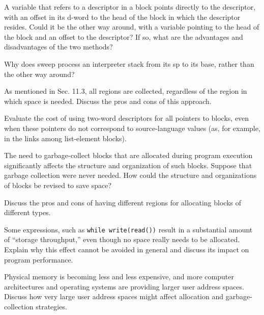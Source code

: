  A variable that refers to a descriptor in a
block points directly to the descriptor, with an offset in its d-word
to the head of the block in which the descriptor resides. Could it be
the other way around, with a variable pointing to the head of the
block and an offset to the descriptor? If so, what are the advantages
and disadvantages of the two methods?

 Why does sweep process an interpreter stack from
its sp to its base, rather than the other way around?

 As mentioned in Sec. 11.3, all regions are
collected, regardless of the region in which space is needed. Discuss
the pros and cons of this approach.

 Evaluate the cost of using two-word descriptors
for all pointers to blocks, even when these pointers do not correspond
to source-language values (as, for example, in the links among
list-element blocks).

 The need to garbage-collect blocks that are
allocated during program execution significantly affects the structure
and organization of such blocks. Suppose that garbage collection were
never needed. How could the structure and organizations of blocks be
revised to save space?

 Discuss the pros and cons of having different
regions for allocating blocks of different types.

 Some expressions, such as\newline
\texttt{while write(read())}\newline
result in a substantial amount of ``storage
throughput,'' even though no space really needs to be
allocated. Explain why this effect cannot be avoided in general and
discuss its impact on program performance.

 Physical memory is becoming less and less
expensive, and more computer architectures and operating systems are
providing larger user address spaces. Discuss how very large user
address spaces might affect allocation and garbage-collection
strategies.
